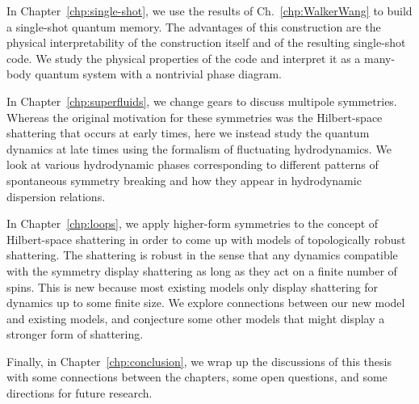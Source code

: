 In Chapter~\ref{chp:single-shot}, we use the results of Ch.~\ref{chp:WalkerWang} to build a single-shot quantum memory. The advantages of this construction are the physical interpretability of the construction itself and of the resulting single-shot code. We study the physical properties of the code and interpret it as a many-body quantum system with a nontrivial phase diagram.

In Chapter~\ref{chp:superfluids}, we change gears to discuss multipole symmetries. Whereas the original motivation for these symmetries was the Hilbert-space shattering that occurs at early times, here we instead study the quantum dynamics at late times using the formalism of fluctuating hydrodynamics. We look at various hydrodynamic phases corresponding to different patterns of spontaneous symmetry breaking and how they appear in hydrodynamic dispersion relations. 

In Chapter~\ref{chp:loops}, we apply higher-form symmetries to the concept of Hilbert-space shattering in order to come up with models of topologically robust shattering. The shattering is robust in the sense that any dynamics compatible with the symmetry display shattering as long as they act on a finite number of spins. This is new because most existing models only display shattering for dynamics up to some finite size. We explore connections between our new model and existing models, and conjecture some other models that might display a stronger form of shattering.

Finally, in Chapter~\ref{chp:conclusion}, we wrap up the discussions of this thesis with some connections between the chapters, some open questions, and some directions for future research.
